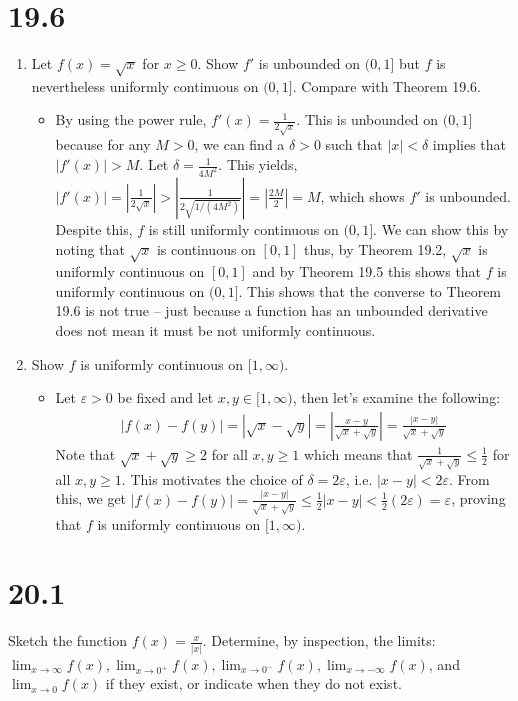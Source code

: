 \documentclass[10pt,a4paper]{article}
\theoremstyle{definition}
\begin{document}
\section*{19.6}
\begin{enumerate}[label = (\alph*)]
\item Let $f(x) = \sqrt{x}$ for $x \geq 0$. Show $f'$ is unbounded on $(0,1]$ but $f$ is nevertheless uniformly continuous on $(0,1]$. Compare with Theorem 19.6.
	\begin{itemize}
	\item By using the power rule, $f'(x) = \frac{1}{2\sqrt{x}}$. This is unbounded on $(0,1]$ because for any $M > 0$, we can find a $\delta > 0$ such that $|x| < \delta$ implies that $|f'(x)| > M$. Let $\delta = \frac{1}{4M^2}$. This yields, $|f'(x)| = \left|\frac{1}{2\sqrt{x}}\right| > \left|\frac{1}{2\sqrt{1/(4M^2)}}\right| = \left|\frac{2M}{2}\right| = M$, which shows $f'$ is unbounded. Despite this, $f$ is still uniformly continuous on $(0,1]$. We can show this by noting that $\sqrt{x}$ is continuous on $[0,1]$ thus, by Theorem 19.2, $\sqrt{x}$ is uniformly continuous on $[0,1]$ and by Theorem 19.5 this shows that $f$ is uniformly continuous on $(0,1]$. This shows that the converse to Theorem 19.6 is not true -- just because a function has an unbounded derivative does not mean it must be not uniformly continuous. 
	\end{itemize}
\item Show $f$ is uniformly continuous on $[1,\infty)$.
	\begin{itemize}
	\item Let $\varepsilon > 0$ be fixed and let $x,y \in [1,\infty)$, then let's examine the following:
	\begin{align*}
	|f(x) - f(y)| = |\sqrt{x} - \sqrt{y}| = \left|\frac{x - y}{\sqrt{x} + \sqrt{y}}\right| = \frac{|x -y|}{\sqrt{x} + \sqrt{y}}
	\end{align*}
	Note that $\sqrt{x} + \sqrt{y} \geq 2$ for all $x,y \geq 1$ which means that $\frac{1}{\sqrt{x} + \sqrt{y}} \leq \frac{1}{2}$ for all $x, y \geq 1$. This motivates the choice of $\delta = 2\varepsilon$, i.e. $|x - y| < 2\varepsilon$. From this, we get $|f(x) - f(y)| = \frac{|x - y|}{\sqrt{x} + \sqrt{y}} \leq \frac{1}{2}|x - y| < \frac{1}{2}(2\varepsilon) = \varepsilon$, proving that $f$ is uniformly continuous on $[1,\infty)$.
	\end{itemize}
\end{enumerate}

\section*{20.1}
Sketch the function $\displaystyle f(x) = \frac{x}{|x|}$. Determine, by inspection, the limits: $\displaystyle \lim_{x \to \infty} f(x), \lim_{x \to 0^+} f(x), \lim_{x \to 0^-} f(x), \lim_{x \to -\infty} f(x)$, and $\displaystyle \lim_{x \to 0} f(x)$ if they exist, or indicate when they do not exist.
\end{document}
